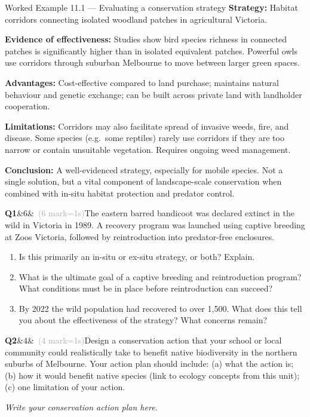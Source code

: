 \documentclass[11pt,a4paper]{article}
\newcommand{\answerbox}[1]{%
  \begin{tcolorbox}[
    enhanced, breakable, arc=2mm,
    colback=Paper, colframe=Line,
    left=2mm, right=2mm, top=1mm, bottom=1mm,
    boxrule=1pt,
    height=#1
  ]
  \end{tcolorbox}%
}
\newcommand{\question}[3]{%
  \needspace{3\baselineskip}%
  \medskip
  \noindent\textbf{Q#1}\ifx&#2&\else\ \textcolor{DarkGrey}{(#2 mark\ifnum#2=1\else s\fi)}\fi\quad #3%
  \medskip
}
\begin{document}
\begin{workedex}{Worked Example 11.1 --- Evaluating a conservation strategy}
\textbf{Strategy:} Habitat corridors connecting isolated woodland patches in agricultural Victoria.

\medskip
\textbf{Evidence of effectiveness:} Studies show bird species richness in connected patches is significantly higher than in isolated equivalent patches. Powerful owls use corridors through suburban Melbourne to move between larger green spaces.

\textbf{Advantages:} Cost-effective compared to land purchase; maintains natural behaviour and genetic exchange; can be built across private land with landholder cooperation.

\textbf{Limitations:} Corridors may also facilitate spread of invasive weeds, fire, and disease. Some species (e.g.\ some reptiles) rarely use corridors if they are too narrow or contain unsuitable vegetation. Requires ongoing weed management.

\textbf{Conclusion:} A well-evidenced strategy, especially for mobile species. Not a single solution, but a vital component of landscape-scale conservation when combined with in-situ habitat protection and predator control.
\end{workedex}

\begin{yr7box}
\question{1}{6}{The eastern barred bandicoot was declared extinct in the wild in Victoria in 1989. A recovery program was launched using captive breeding at Zoos Victoria, followed by reintroduction into predator-free enclosures.}

\begin{enumerate}[itemsep=4pt, label=(\alph*)]
  \item Is this primarily an in-situ or ex-situ strategy, or both? Explain.
  \answerbox{3.5cm}
  \item What is the ultimate goal of a captive breeding and reintroduction program? What conditions must be in place before reintroduction can succeed?
  \answerbox{4cm}
  \item By 2022 the wild population had recovered to over 1,500. What does this tell you about the effectiveness of the strategy? What concerns remain?
  \answerbox{4cm}
\end{enumerate}
\newpage
\question{2}{4}{Design a conservation action that your school or local community could realistically take to benefit native biodiversity in the northern suburbs of Melbourne. Your action plan should include: (a) what the action is; (b) how it would benefit native species (link to ecology concepts from this unit); (c) one limitation of your action.}

\begin{tcolorbox}[colback=white, colframe=MidGrey, height=6cm, boxrule=0.5pt]
\textit{\color{MidGrey}Write your conservation action plan here.}
\end{tcolorbox}
\end{yr7box}
\end{document}
